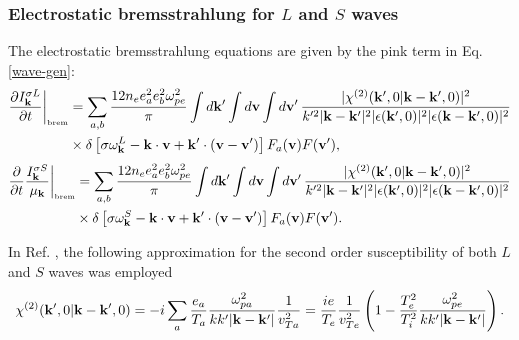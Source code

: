 \documentclass[12pt,a4paper,ruledheader]{report}
\begin{document}
\subsubsection{Electrostatic bremsstrahlung for $L$ and $S$ waves}
The electrostatic bremsstrahlung equations are given by the pink term
in Eq. \eqref{wave-gen}:
\begin{equation}
\label{PkL,1}
  \begin{split}
    \frac{\partial I_{\bf k}^{\sigma L}}{\partial t}\biggr|_{\mbox{\tiny brem}}&=\sum_{a,b}
\frac{12n_ee_a^2e_b^2\omega_{pe}^2}{\pi}\int d{\bf k}'\int d{\bf v}\int d{\bf v}'
\,\frac{|\chi^{(2)}({\bf k}',0|{\bf k}-{\bf k}',0)|^2}{k'^2|{\bf k}-{\bf k}'|^2
|\epsilon({\bf k}',0)|^2|\epsilon({\bf k}-{\bf k}',0)|^2}\\
&\times\delta\left[\sigma\omega_{\bf k}^L-{\bf k}\cdot{\bf v}+{\bf k}'\cdot
  ({\bf v}-{\bf v}')\right]F_a({\bf v})F({\bf v}'),\\
\end{split}
\end{equation}
\begin{equation}
     \label{PkS,1}
  \begin{split}
 \frac{\partial}{\partial t}
\frac{I_{\bf k}^{\sigma S}}{\mu_{\bf k}}\biggr|_{\mbox{\tiny brem}}&=\sum_{a,b}
\frac{12n_ee_a^2e_b^2\omega_{pe}^2}{\pi}
\int d{\bf k}'\int d{\bf v}\int d{\bf v}'
\,\frac{|\chi^{(2)}({\bf k}',0|{\bf k}-{\bf k}',0)|^2}{k'^2|{\bf k}-{\bf k}'|^2
|\epsilon({\bf k}',0)|^2|\epsilon({\bf k}-{\bf k}',0)|^2}\\
&\times\delta\left[\sigma\omega_{\bf k}^S-{\bf k}\cdot{\bf v}+{\bf k}'\cdot
  ({\bf v}-{\bf v}')\right]F_a({\bf v})F({\bf v}').
  \end{split}
\end{equation}


In Ref. \cite{YZKS16}, the following approximation for the
second order susceptibility of both $L$ and $S$ waves was
employed
\begin{equation}
  \label{sec-susc-brem}
  \chi^{(2)}({\bf k}',0|{\bf k}-{\bf k}',0)
  =-i \sum_a\frac{e_a}{T_a} \frac{\omega_{pa}^2}{k k' |{\bf k-k'}|}\frac{1}{v_{Ta}^2}
  =\frac{i e}{T_e}\frac{1}{v_{Te}^2}\left( 1-\frac{T_e^2}{T_i^2}
  \frac{\omega_{pe}^2}{k k' |{\bf k-k'}|}\right).
\end{equation}
\end{document}
